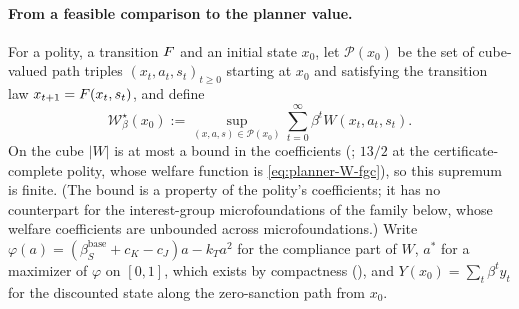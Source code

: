 \paragraph{From a feasible comparison to the planner value.}
For a polity, a transition $F$ and an initial state \(x_0\), let
\(\mathcal P(x_0)\) be the set of
cube-valued path triples \((x_t,a_t,s_t)_{t\ge0}\) starting at \(x_0\) and
satisfying the transition law \(x_{t+1}=F(x_t,s_t)\), and define
\[
\mathcal W^\star_\beta(x_0)
:=
\sup_{(x,a,s)\in\mathcal P(x_0)}
\sum_{t=0}^{\infty}\beta^tW(x_t,a_t,s_t).
\]
On the cube \(\lvert W\rvert\) is at most a bound in the coefficients
(; \(13/2\) at the certificate-complete polity, whose
welfare function is \eqref{eq:planner-W-fgc}), so this supremum is finite.
(The bound is a property of the polity's coefficients; it has no counterpart
for the interest-group microfoundations of the family below, whose welfare coefficients
are unbounded across microfoundations.) Write
\(\varphi(a)=(\beta^{\mathrm{base}}_S+c_K-c_J)a-k_Ta^2\) for the compliance part
of $W$, \(a^\ast\) for a maximizer of \(\varphi\) on \([0,1]\), which exists by
compactness (), and
\(Y(x_0)=\sum_t\beta^ty_t\) for the discounted state along the zero-sanction
path from \(x_0\).

